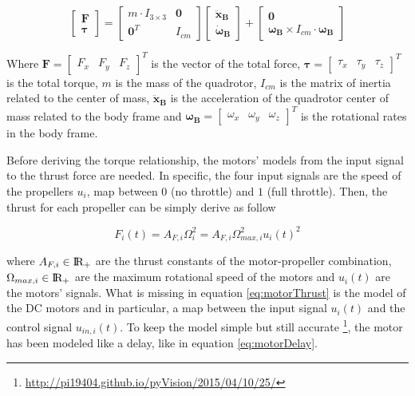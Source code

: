 \begin{equation}
	\begin{bmatrix}
		\mathbf{F} \\
		\boldsymbol{\tau}
	\end{bmatrix}
	=
	\begin{bmatrix}
		m \cdot I_{3\times 3} & \mathbf{0} \\
		\mathbf{0}^T & I_{cm}
	\end{bmatrix}
	\begin{bmatrix}
		\mathbf{\ddot{x}_B} \\
		\boldsymbol{\dot{\omega}_B}
	\end{bmatrix}
	+
	\begin{bmatrix}
		\mathbf{0} \\
		\boldsymbol{\omega_B} \times I_{cm} \cdot \boldsymbol{\omega_B}
	\end{bmatrix}
	\label{eq:NewtonEuler}
\end{equation}

\noindent Where $\mathbf{F} = \begin{bmatrix} F_x & F_y & F_z \end{bmatrix}^T$ is the vector of the total force, $\boldsymbol{\tau} = \begin{bmatrix} \tau_x & \tau_y & \tau_z \end{bmatrix}^T$ is the total torque, $m$ is the mass of the quadrotor, $I_{cm}$ is the matrix of inertia related to the center of mass, $\mathbf{\ddot{x}_B}$ is the acceleration of the quadrotor center of mass related to the body frame and $\boldsymbol{\omega_B} = \begin{bmatrix} \omega_x & \omega_y & \omega_z \end{bmatrix}^T$ is the rotational rates in the body frame.

\noindent Before deriving the torque relationship, the motors' models from the input signal to the thrust force are needed. In specific, the four input signals are the speed of the propellers $u_i$, map between $0$ (no throttle) and $1$ (full throttle). Then, the thrust for each propeller can be simply derive as follow

\begin{equation}
	F_i(t) = A_{F,i} \Omega_i^2 = A_{F,i}\Omega_{max, i}^2 u_i(t)^2
	\label{eq:motorThrust}
\end{equation}

\noindent where $A_{F,i} \in \rm I\!R_+$ are the thrust constants of the motor-propeller combination, $\Omega_{max, i} \in \rm I\!R_+$ are the maximum rotational speed of the motors and $u_i(t)$ are the motors' signals. What is missing in equation \eqref{eq:motorThrust} is the model of the DC motors and in particular, a map between the input signal $u_i(t)$ and the control signal $u_{in,i}(t)$. To keep the model simple but still accurate \footnote{\url{http://pi19404.github.io/pyVision/2015/04/10/25/}}, the motor has been modeled like a delay, like in equation \eqref{eq:motorDelay}.


